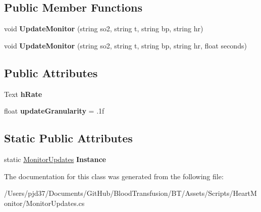 \subsection*{Public Member Functions}
\begin{DoxyCompactItemize}
\item 
void {\bfseries Update\+Monitor} (string so2, string t, string bp, string hr)\hypertarget{class_monitor_updates_a26effbc55fb666d91fcc815e763541a2}{}\label{class_monitor_updates_a26effbc55fb666d91fcc815e763541a2}

\item 
void {\bfseries Update\+Monitor} (string so2, string t, string bp, string hr, float seconds)\hypertarget{class_monitor_updates_a716c4efc3099b7d80ed07eccf1ee3832}{}\label{class_monitor_updates_a716c4efc3099b7d80ed07eccf1ee3832}

\end{DoxyCompactItemize}
\subsection*{Public Attributes}
\begin{DoxyCompactItemize}
\item 
Text {\bfseries h\+Rate}\hypertarget{class_monitor_updates_a00da4c4861e6a7eab7974ed00d505270}{}\label{class_monitor_updates_a00da4c4861e6a7eab7974ed00d505270}

\item 
float {\bfseries update\+Granularity} = .\+1f\hypertarget{class_monitor_updates_aad4099a2b55705f000383dedba56946e}{}\label{class_monitor_updates_aad4099a2b55705f000383dedba56946e}

\end{DoxyCompactItemize}
\subsection*{Static Public Attributes}
\begin{DoxyCompactItemize}
\item 
static \hyperlink{class_monitor_updates}{Monitor\+Updates} {\bfseries Instance}\hypertarget{class_monitor_updates_ac68309cd14b8d3437e32f719f6befd3d}{}\label{class_monitor_updates_ac68309cd14b8d3437e32f719f6befd3d}

\end{DoxyCompactItemize}


The documentation for this class was generated from the following file\+:\begin{DoxyCompactItemize}
\item 
/\+Users/pjd37/\+Documents/\+Git\+Hub/\+Blood\+Transfusion/\+B\+T/\+Assets/\+Scripts/\+Heart\+Monitor/Monitor\+Updates.\+cs\end{DoxyCompactItemize}

